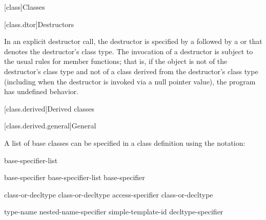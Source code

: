 \documentclass{wg21}
\begin{document}
[class]{Classes}

[class.dtor]{Destructors}%


\pnum
{}%
In an explicit destructor call, the destructor is specified by a
\tcode{\~{}}
followed by a
 or 
that denotes the destructor's class type.
The invocation of a destructor is subject to the usual rules for member
functions;
that is, if the object is not of the destructor's class type and
not of a class derived from the destructor's class type (including when
the destructor is invoked via a null pointer value), the program has
undefined behavior.

[class.derived]{Derived classes}%

[class.derived.general]{General}%


\pnum
{}%
%
%
A list of base classes can be specified in a class definition using
the notation:

\begin{bnf}
    \br
    \terminal{:} base-specifier-list
\end{bnf}


\begin{bnf}
    \br
    base-specifier \br
    base-specifier-list \terminal{,} base-specifier 
\end{bnf}

\begin{bnf}
    \br
     class-or-decltype\br
       class-or-decltype\br
     access-specifier  class-or-decltype
\end{bnf}

\begin{bnf}
    \br
     type-name\br
    nested-name-specifier  simple-template-id\br
    decltype-specifier\br
\end{bnf}
\end{document}
